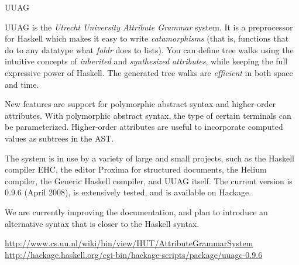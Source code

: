 \documentclass{article}
\begin{document}
\begin{hcarentry}{UUAG}
\makeheader

UUAG is the \emph{Utrecht University Attribute Grammar} system. It is a preprocessor for Haskell which makes it easy to write \emph{catamorphisms} (that is, functions that do to any datatype what \emph{foldr} does to lists). You can define tree walks using the intuitive concepts of \emph{inherited} and \emph{synthesized attributes}, while keeping the full expressive power of Haskell. The generated tree walks are \emph{efficient} in both space and time.

New features are support for polymorphic abstract syntax and higher-order attributes. With polymorphic abstract syntax, the type of certain terminals can be parameterized. Higher-order attributes are useful to incorporate computed values as subtrees in the AST.

The system is in use by a variety of large and small projects, such as the Haskell compiler EHC, the editor Proxima for structured documents, the Helium compiler, the Generic Haskell compiler, and UUAG itself. The current version is 0.9.6 (April 2008), is extensively tested, and is available on Hackage.

We are currently improving the documentation, and plan to introduce an alternative syntax that is closer to the Haskell syntax.

\FurtherReading
  \url{http://www.cs.uu.nl/wiki/bin/view/HUT/AttributeGrammarSystem}\\
  \url{http://hackage.haskell.org/cgi-bin/hackage-scripts/package/uuagc-0.9.6}
\end{hcarentry}
\end{document}
